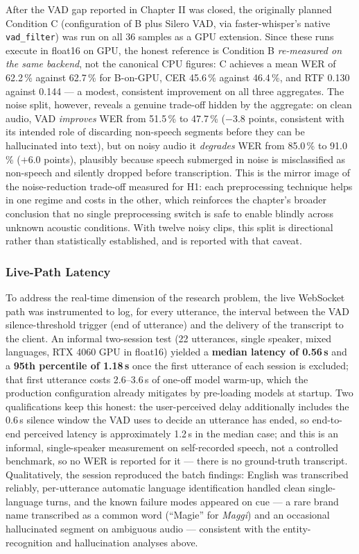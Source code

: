 \documentclass[12pt]{report}
\begin{document}
After the VAD gap reported in Chapter II was closed, the originally planned Condition C (configuration of B plus Silero VAD, via faster-whisper's native \texttt{vad\_filter}) was run on all 36 samples as a GPU extension. Since these runs execute in float16 on GPU, the honest reference is Condition B \emph{re-measured on the same backend}, not the canonical CPU figures: C achieves a mean WER of 62.2\,\% against 62.7\,\% for B-on-GPU, CER 45.6\,\% against 46.4\,\%, and RTF 0.130 against 0.144 --- a modest, consistent improvement on all three aggregates. The noise split, however, reveals a genuine trade-off hidden by the aggregate: on clean audio, VAD \emph{improves} WER from 51.5\,\% to 47.7\,\% ($-3.8$ points, consistent with its intended role of discarding non-speech segments before they can be hallucinated into text), but on noisy audio it \emph{degrades} WER from 85.0\,\% to 91.0\,\% ($+6.0$ points), plausibly because speech submerged in noise is misclassified as non-speech and silently dropped before transcription. This is the mirror image of the noise-reduction trade-off measured for H1: each preprocessing technique helps in one regime and costs in the other, which reinforces the chapter's broader conclusion that no single preprocessing switch is safe to enable blindly across unknown acoustic conditions. With twelve noisy clips, this split is directional rather than statistically established, and is reported with that caveat.

\subsubsection{Live-Path Latency}

To address the real-time dimension of the research problem, the live WebSocket path was instrumented to log, for every utterance, the interval between the VAD silence-threshold trigger (end of utterance) and the delivery of the transcript to the client. An informal two-session test (22 utterances, single speaker, mixed languages, RTX 4060 GPU in float16) yielded a \textbf{median latency of 0.56\,s} and a \textbf{95th percentile of 1.18\,s} once the first utterance of each session is excluded; that first utterance costs 2.6--3.6\,s of one-off model warm-up, which the production configuration already mitigates by pre-loading models at startup. Two qualifications keep this honest: the user-perceived delay additionally includes the 0.6\,s silence window the VAD uses to decide an utterance has ended, so end-to-end perceived latency is approximately 1.2\,s in the median case; and this is an informal, single-speaker measurement on self-recorded speech, not a controlled benchmark, so no WER is reported for it --- there is no ground-truth transcript. Qualitatively, the session reproduced the batch findings: English was transcribed reliably, per-utterance automatic language identification handled clean single-language turns, and the known failure modes appeared on cue --- a rare brand name transcribed as a common word (\enquote{Magie} for \emph{Maggi}) and an occasional hallucinated segment on ambiguous audio --- consistent with the entity-recognition and hallucination analyses above.
\end{document}
